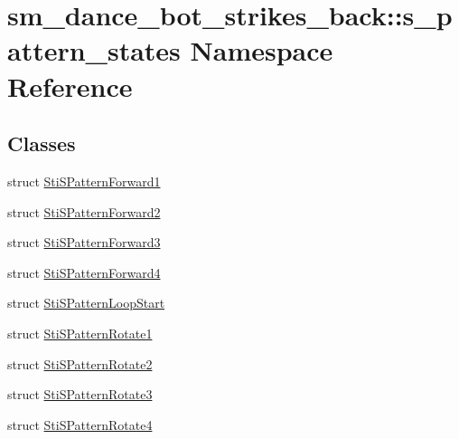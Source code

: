 \hypertarget{namespacesm__dance__bot__strikes__back_1_1s__pattern__states}{}\section{sm\+\_\+dance\+\_\+bot\+\_\+strikes\+\_\+back\+:\+:s\+\_\+pattern\+\_\+states Namespace Reference}
\label{namespacesm__dance__bot__strikes__back_1_1s__pattern__states}
\subsection*{Classes}
\begin{DoxyCompactItemize}
\item 
struct \hyperlink{structsm__dance__bot__strikes__back_1_1s__pattern__states_1_1StiSPatternForward1}{Sti\+S\+Pattern\+Forward1}
\item 
struct \hyperlink{structsm__dance__bot__strikes__back_1_1s__pattern__states_1_1StiSPatternForward2}{Sti\+S\+Pattern\+Forward2}
\item 
struct \hyperlink{structsm__dance__bot__strikes__back_1_1s__pattern__states_1_1StiSPatternForward3}{Sti\+S\+Pattern\+Forward3}
\item 
struct \hyperlink{structsm__dance__bot__strikes__back_1_1s__pattern__states_1_1StiSPatternForward4}{Sti\+S\+Pattern\+Forward4}
\item 
struct \hyperlink{structsm__dance__bot__strikes__back_1_1s__pattern__states_1_1StiSPatternLoopStart}{Sti\+S\+Pattern\+Loop\+Start}
\item 
struct \hyperlink{structsm__dance__bot__strikes__back_1_1s__pattern__states_1_1StiSPatternRotate1}{Sti\+S\+Pattern\+Rotate1}
\item 
struct \hyperlink{structsm__dance__bot__strikes__back_1_1s__pattern__states_1_1StiSPatternRotate2}{Sti\+S\+Pattern\+Rotate2}
\item 
struct \hyperlink{structsm__dance__bot__strikes__back_1_1s__pattern__states_1_1StiSPatternRotate3}{Sti\+S\+Pattern\+Rotate3}
\item 
struct \hyperlink{structsm__dance__bot__strikes__back_1_1s__pattern__states_1_1StiSPatternRotate4}{Sti\+S\+Pattern\+Rotate4}
\end{DoxyCompactItemize}
